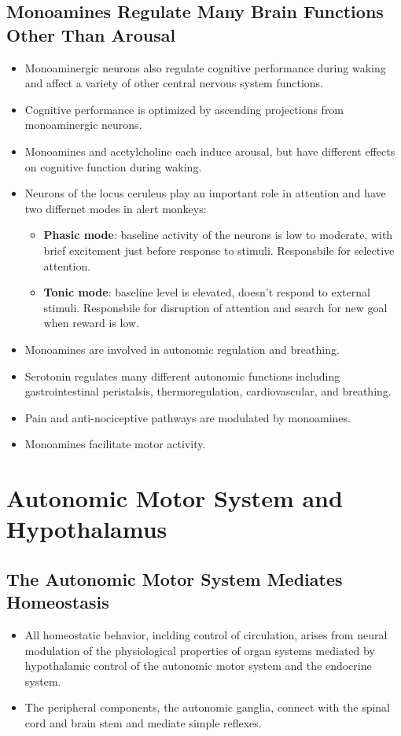 \documentclass[12pt,a4paper]{article}
\begin{document}
\subsection{Monoamines Regulate Many Brain Functions Other Than Arousal}
\begin{itemize}
    \item Monoaminergic neurons also regulate cognitive performance during waking and affect a variety of other central nervous system functions.
    \item Cognitive performance is optimized by ascending projections from monoaminergic neurons.
    \item Monoamines and acetylcholine each induce arousal, but have different effects on cognitive function during waking.
    \item Neurons of the locus ceruleus play an important role in attention and have two differnet modes in alert monkeys:
        \begin{itemize}
            \item \textbf{Phasic mode}: baseline activity of the neurons is low to moderate, with brief excitement just before response to stimuli. Responsbile for selective attention.
            \item \textbf{Tonic mode}: baseline level is elevated, doesn't respond to external stimuli. Responsbile for disruption of attention and search for new goal when reward is low.
        \end{itemize}
    \item Monoamines are involved in autonomic regulation and breathing.
    \item Serotonin regulates many different autonomic functions including gastrointestinal peristalsis, thermoregulation, cardiovascular, and breathing.
    \item Pain and anti-nociceptive pathways are modulated by monoamines.
    \item Monoamines facilitate motor activity.
\end{itemize}

\clearpage
\section{Autonomic Motor System and Hypothalamus}
\subsection{The Autonomic Motor System Mediates Homeostasis}
\begin{itemize}
    \item All homeostatic behavior, inclding control of circulation, arises from neural modulation of the physiological properties of organ systems mediated by hypothalamic control of the autonomic motor system and the endocrine system.
    \item The peripheral components, the autonomic ganglia, connect with the spinal cord and brain stem and mediate simple reflexes.
\end{itemize}
\end{document}
